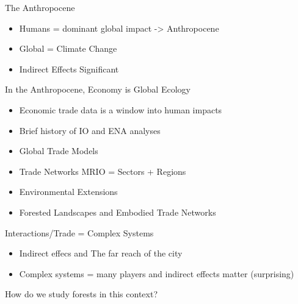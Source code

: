 \documentclass[ignorenonframetext,]{beamer}
\providecommand{\tightlist}{%
  \setlength{\itemsep}{0pt}\setlength{\parskip}{0pt}}
\begin{document}
\begin{frame}{The Anthropocene}
\protect\hypertarget{the-anthropocene}{}

\begin{itemize}
\tightlist
\item
  Humans = dominant global impact -\textgreater{} Anthropocene
\item
  Global = Climate Change
\item
  Indirect Effects Significant
\end{itemize}

\end{frame}

\begin{frame}{In the Anthropocene, Economy is Global Ecology}
\protect\hypertarget{in-the-anthropocene-economy-is-global-ecology}{}

\begin{itemize}
\tightlist
\item
  Economic trade data is a window into human impacts
\item
  Brief history of IO and ENA analyses
\item
  Global Trade Models
\item
  Trade Networks MRIO = Sectors + Regions
\item
  Environmental Extensions
\item
  Forested Landscapes and Embodied Trade Networks
\end{itemize}

\end{frame}

\begin{frame}{Interactions/Trade = Complex Systems}
\protect\hypertarget{interactionstrade-complex-systems}{}

\begin{itemize}
\tightlist
\item
  Indirect effecs and The far reach of the city
\item
  Complex systems = many players and indirect effects matter
  (surprising)
\end{itemize}

\end{frame}

\begin{frame}{How do we study forests in this context?}
\protect\hypertarget{how-do-we-study-forests-in-this-context}{}

\end{frame}
\end{document}
